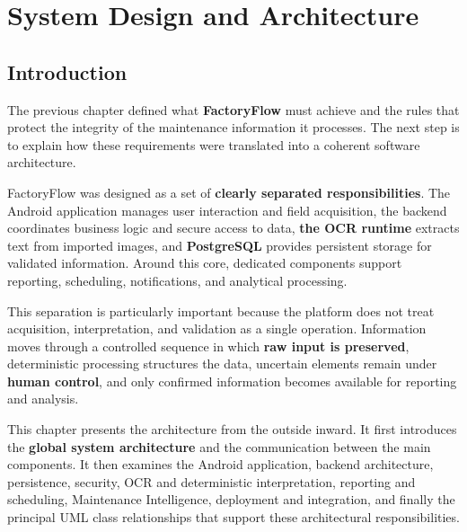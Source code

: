 \chapter{System Design and Architecture}
\label{chap:architecture}


\section{Introduction}
\label{sec:architecture-introduction}

The previous chapter defined what \textbf{FactoryFlow} must achieve and the rules that protect the integrity of the maintenance information it processes. The next step is to explain how these requirements were translated into a coherent software architecture.

FactoryFlow was designed as a set of \textbf{clearly separated responsibilities}. The Android application manages user interaction and field acquisition, the backend coordinates business logic and secure access to data, \textbf{the OCR runtime} extracts text from imported images, and \textbf{PostgreSQL} provides persistent storage for validated information. Around this core, dedicated components support reporting, scheduling, notifications, and analytical processing.

This separation is particularly important because the platform does not treat acquisition, interpretation, and validation as a single operation. Information moves through a controlled sequence in which \textbf{raw input is preserved}, deterministic processing structures the data, uncertain elements remain under \textbf{human control}, and only confirmed information becomes available for reporting and analysis.

This chapter presents the architecture from the outside inward. It first introduces the \textbf{global system architecture} and the communication between the main components. It then examines the Android application, backend architecture, persistence, security, OCR and deterministic interpretation, reporting and scheduling, Maintenance Intelligence, deployment and integration, and finally the principal UML class relationships that support these architectural responsibilities.



